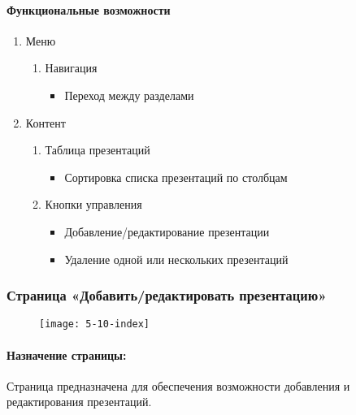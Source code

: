 \paragraph{Функциональные возможности}
\begin{enumerate}
	\item Меню
	\begin{enumerate}
		\item Навигация
		\begin{itemize}
			\item Переход между разделами
		\end{itemize}
	\end{enumerate}

	\item Контент
	\begin{enumerate}
		\item Таблица презентаций
		\begin{itemize}
			\item Сортировка списка презентаций по столбцам
		\end{itemize}

		\item Кнопки управления
		\begin{itemize}
			\item Добавление/редактирование презентации
			\item Удаление одной или нескольких презентаций
		\end{itemize}
	\end{enumerate}
\end{enumerate}


\subsubsection{Страница «Добавить/редактировать презентацию»}
\begin{figure}[H]
	\texttt{[image: 5-10-index]}
\end{figure}
\paragraph{Назначение страницы:} Страница предназначена для обеспечения возможности добавления и редактирования презентаций.

